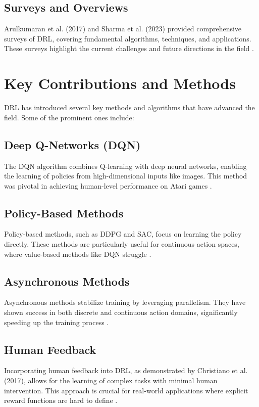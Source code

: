 \documentclass{article}
\begin{document}
\subsection{Surveys and Overviews}
Arulkumaran et al. (2017) and Sharma et al. (2023) provided comprehensive surveys of DRL, covering fundamental algorithms, techniques, and applications. These surveys highlight the current challenges and future directions in the field \cite{arulkumaran2017deep, sharma2023deep}.

\section{Key Contributions and Methods}
DRL has introduced several key methods and algorithms that have advanced the field. Some of the prominent ones include:

\subsection{Deep Q-Networks (DQN)}
The DQN algorithm combines Q-learning with deep neural networks, enabling the learning of policies from high-dimensional inputs like images. This method was pivotal in achieving human-level performance on Atari games \cite{mnih2015human}.

\subsection{Policy-Based Methods}
Policy-based methods, such as DDPG and SAC, focus on learning the policy directly. These methods are particularly useful for continuous action spaces, where value-based methods like DQN struggle \cite{lillicrap2015continuous, haarnoja2018soft}.

\subsection{Asynchronous Methods}
Asynchronous methods stabilize training by leveraging parallelism. They have shown success in both discrete and continuous action domains, significantly speeding up the training process \cite{mnih2016asynchronous}.

\subsection{Human Feedback}
Incorporating human feedback into DRL, as demonstrated by Christiano et al. (2017), allows for the learning of complex tasks with minimal human intervention. This approach is crucial for real-world applications where explicit reward functions are hard to define \cite{christiano2017deep}.
\end{document}
